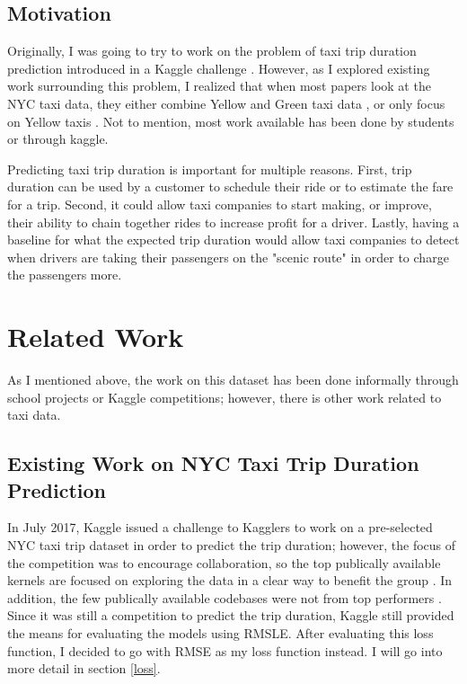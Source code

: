\documentclass[conference]{IEEEtran}
\begin{document}
\subsection{Motivation}
Originally, I was going to try to work on the problem of taxi trip duration prediction introduced in a Kaggle challenge \cite{kaggle}.  However, as I explored existing work surrounding this problem, I realized that when most papers look at the NYC taxi data, they either combine Yellow and Green taxi data \cite{blog}, or only focus on Yellow taxis \cite{kaggle}\cite{ucsd}.  Not to mention, most work available has been done by students or through kaggle.

Predicting taxi trip duration is important for multiple reasons.  First, trip duration can be used by a customer to schedule their ride or to estimate the fare for a trip.  Second, it could allow taxi companies to start making, or improve, their ability to chain together rides to increase profit for a driver.  Lastly, having a baseline for what the expected trip duration would allow taxi companies to detect when drivers are taking their passengers on the "scenic route" in order to charge the passengers more.


\section{Related Work}
As I mentioned above, the work on this dataset has been done informally through school projects or Kaggle competitions; however, there is other work related to taxi data.

\subsection{Existing Work on NYC Taxi Trip Duration Prediction}
In July 2017, Kaggle issued a challenge to Kagglers to work on a pre-selected NYC taxi trip dataset in order to predict the trip duration; however, the focus of the competition was to encourage collaboration, so the top publically available kernels are focused on exploring the data in a clear way to benefit the group \cite{kaggle}.  In addition, the few publically available codebases were not from top performers \cite{currie} \cite{yukw} \cite{mk}.  Since it was still a competition to predict the trip duration, Kaggle still provided the means for evaluating the models using RMSLE.  After evaluating this loss function, I decided to go with RMSE as my loss function instead.  I will go into more detail in section \ref{loss}.
\end{document}
